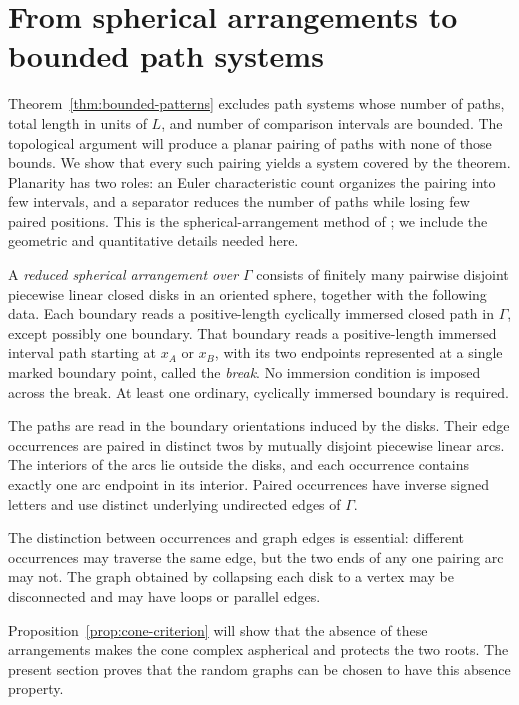 \section{From spherical arrangements to bounded path systems}
\label{sec:planar}

Theorem~\ref{thm:bounded-patterns} excludes path systems whose number of
paths, total length in units of $L$, and number of comparison intervals
are bounded.  The topological argument will produce a planar pairing of
paths with none of those bounds.  We show that every such pairing
yields a system covered by the theorem.  Planarity has two roles: an
Euler characteristic count organizes the pairing into few intervals,
and a separator reduces the number of paths while losing few paired
positions.  This is the spherical-arrangement method of
\cite[Section ``From bounded patterns to spherical arrangements'']{OpenAI2026ZD};
we include the geometric and quantitative details needed here.

\begin{definition}
\label{def:reduced-arrangement}
A \emph{reduced spherical arrangement over $\Gamma$} consists of
finitely many pairwise disjoint piecewise linear closed disks in an
oriented sphere, together with the following data.
Each boundary reads a positive-length cyclically immersed closed path
in $\Gamma$, except possibly one boundary.  That boundary reads a
positive-length immersed interval path starting at $x_A$ or $x_B$,
with its two endpoints represented at a single marked boundary point,
called the \emph{break}.  No immersion condition is imposed across the
break.  At least one ordinary, cyclically immersed boundary is required.

The paths are read in the boundary orientations induced by the disks.
Their edge occurrences are paired in distinct twos by mutually disjoint
piecewise linear arcs.  The interiors of the arcs lie outside the disks,
and each occurrence contains exactly one arc endpoint in its interior.
Paired occurrences have inverse signed letters and use distinct
underlying undirected edges of $\Gamma$.
\end{definition}

The distinction between occurrences and graph edges is essential:
different occurrences may traverse the same edge, but the two ends of
any one pairing arc may not.  The graph obtained by collapsing each
disk to a vertex may be disconnected and may have loops or parallel
edges.

Proposition~\ref{prop:cone-criterion} will show that the absence of
these arrangements makes the cone complex aspherical and protects the
two roots. The present section proves that the random graphs can be
chosen to have this absence property.

